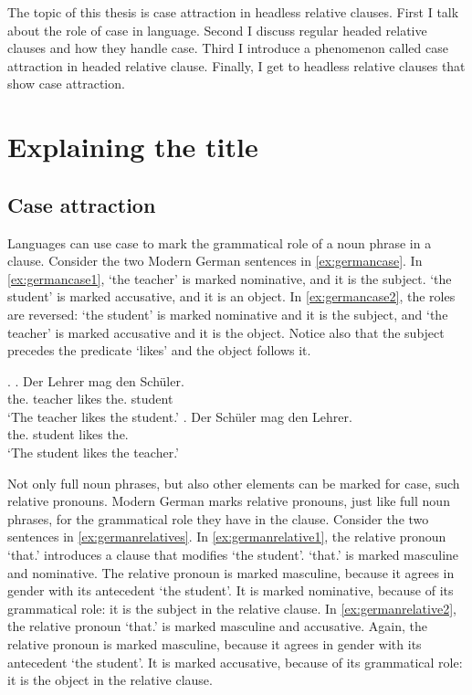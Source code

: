 

The topic of this thesis is case attraction in headless relative clauses. First I talk about the role of case in language. Second I discuss regular headed relative clauses and how they handle case. Third I introduce a phenomenon called case attraction in headed relative clause. Finally, I get to headless relative clauses that show case attraction.


\section{Explaining the title}


\subsection{Case attraction}

Languages can use case to mark the grammatical role of a noun phrase in a clause. Consider the two Modern German sentences in \ref{ex:germancase}. In \ref{ex:germancase1},  `the teacher' is marked nominative, and it is the subject.  `the student' is marked accusative, and it is an object. In \ref{ex:germancase2}, the roles are reversed:  `the student' is marked nominative and it is the subject, and  `the teacher' is marked accusative and it is the object. Notice also that the subject precedes the predicate  `likes' and the object follows it.

\ex.\label{ex:germancase}
\ag. Der Lehrer mag den Schüler.\\
 the. teacher likes the. student\\
 `The teacher likes the student.'\label{ex:germancase1}
\bg. Der Schüler mag den Lehrer.\\
 the. student likes the.\\
 `The student likes the teacher.'\label{ex:germancase2}

Not only full noun phrases, but also other elements can be marked for case, such relative pronouns. Modern German marks relative pronouns, just like full noun phrases, for the grammatical role they have in the clause. Consider the two sentences in \ref{ex:germanrelatives}. In \ref{ex:germanrelative1}, the relative pronoun  `that.' introduces a clause that modifies  `the student'.  `that.' is marked masculine and nominative. The relative pronoun is marked masculine, because it agrees in gender with its antecedent  `the student'. It is marked nominative, because of its grammatical role: it is the subject in the relative clause.
In \ref{ex:germanrelative2}, the relative pronoun  `that.' is marked masculine and accusative. Again, the relative pronoun is marked masculine, because it agrees in gender with its antecedent  `the student'. It is marked accusative, because of its grammatical role: it is the object in the relative clause.

